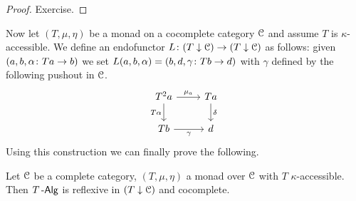 \documentclass[a4paper,11pt,oneside,openany]{scrbook}
\begin{document}
\begin{proof}
	Exercise.
\end{proof}
Now let $ (T,\mu,\eta) $ be a monad on a cocomplete category $ \operatorname{\mathcal{C}} $ and assume $
T $ is $ \kappa $-accessible.
We define an endofunctor $ L \colon (T\downarrow\operatorname{\mathcal{C}}) \to (T\downarrow\operatorname{\mathcal{C}}) $ as
follows: given $ (a,b,\alpha\colon Ta \to b) $ we set $ L(a,b,\alpha) =
(b,d,\gamma \colon Tb \to d) $ with $ \gamma $ defined by the following pushout
in $ \operatorname{\mathcal{C}} $.
\begin{displaymath}
	\begin{tikzcd}
		T^2 a \arrow[r, "\mu_a"]\arrow[d, "T\alpha"'] &  Ta \arrow[d, "\delta"]\\
		Tb \arrow[r,"\gamma"'] & d
	\end{tikzcd}
\end{displaymath}
Using this construction we can finally prove the following.
\begin{thm}
	Let $\operatorname{\mathcal{C}}$ be a complete category, $(T,\mu,\eta)$ a monad over $\operatorname{\mathcal{C}}$ with $T$
    $\kappa$-accessible. Then $T\operatorname{-\mathsf{Alg}}$ is reflexive in $(T\downarrow\operatorname{\mathcal{C}})$ and
    cocomplete.
\end{thm}
\end{document}
